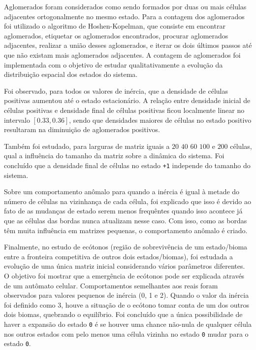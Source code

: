 \documentclass[
	12pt,				%
	openright,			%
	twoside,			%
	a4paper,			%
	english,			%
	french,				%
	spanish,			%
	brazil				%
	]{abntex2}
\begin{document}
Aglomerados foram considerados como sendo formados por duas ou mais células adjacentes ortogonalmente no mesmo estado. 
Para a contagem dos aglomerados foi utilizado o algoritmo de Hoshen-Kopelman, que consiste em encontrar aglomerados, etiquetar os aglomerados encontrados, procurar aglomerados adjacentes, realizar a união desses aglomerados, e iterar os dois últimos passos até que não existam mais aglomerados adjacentes. A contagem de aglomerados foi implementada com o objetivo de estudar qualitativamente a evolução da distribuição espacial dos estados do sistema.

Foi observado, para todos os valores de inércia, que a densidade de células positivas aumentou até o estado estacionário. A relação entre densidade inicial de células positivas e densidade final de células positivas ficou localmente linear no intervalo $[0.33, 0.36]$, sendo que densidades maiores de células no estado positivo resultaram na diminuição de aglomerados positivos.

Também foi estudado, para larguras de matriz iguais a $20$ $40$ $60$ $100$ e $200$ células, qual a influência do tamanho da matriz sobre a dinâmica do sistema. Foi concluído que a densidade final de células no estado \texttt{+1} independe do tamanho do sistema.

Sobre um comportamento anômalo para quando a inércia é igual à metade do número de células na vizinhança de cada célula, foi explicado que isso é devido ao fato de as mudanças de estado serem menos frequêntes quando isso acontece já que as células das bordas nunca atualizam nesse caso. Com isso, como as bordas têm muita influência em matrizes pequenas, o comportamento anômalo é criado.

Finalmente, no estudo de ecótonos (região de sobrevivência de um estado/bioma entre a fronteira competitiva de outros dois estados/biomas), foi estudada a evolução de uma única matriz inicial considerando vários parâmetros diferentes. O objetivo foi mostrar que a emergência de ecótonos pode ser explicada através de um autômato celular. Comportamentos semelhantes aos reais foram observados para valores pequenos de inércia (0, 1 e 2). Quando o valor da inércia foi definido como $3$, houve a situação de o ecótono tomar conta de um dos outros dois biomas, quebrando o equilíbrio. Foi concluído que a única possibilidade de haver a expansão do estado \texttt{0} é se houver uma chance não-nula de qualquer célula nos outros estados com pelo menos uma célula vizinha no estado \texttt{0} mudar para o estado \texttt{0}.
\end{document}
